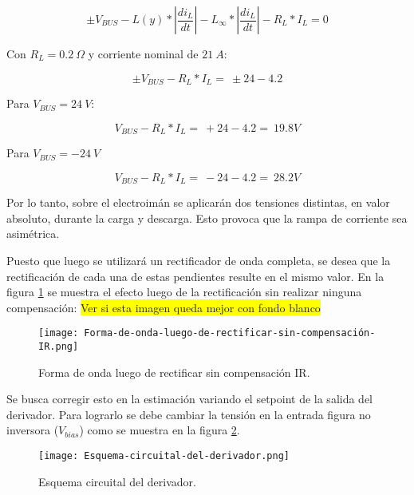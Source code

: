 \begin{equation} \label{eq_Vbus-didt-RL}
\pm V_{BUS}-L(y)*\left|\frac{{di}_L}{dt}\right|-L_{\infty }*\left|\frac{{di}_L}{dt}\right|-R_L*I_L=0
\end{equation}

\noindent Con  $R_L=0.2\ \mathit{\Omega}$ y corriente nominal  de $21\ A$:

\begin{equation} \label{eq_Vbus-didt-RL-2}
\pm V_{BUS}-R_L*I_L=\ \pm 24-4.2
\end{equation}

\noindent Para $V_{BUS}=24\ V$:

\begin{equation} \label{eq_Vbus-didt-RL-3}
	V_{BUS}-R_L*I_L=\ +24-4.2=\ 19.8V
\end{equation}

\noindent Para $V_{BUS}=-24\ V$

\begin{equation} \label{eq_Vbus-didt-RL-4}
	V_{BUS}-R_L*I_L=\ -24-4.2=\ 28.2V
\end{equation}

\noindent Por lo tanto, sobre el electroim\'{a}n se aplicar\'{a}n dos tensiones distintas, en valor absoluto, durante la carga y descarga. Esto provoca que la rampa de corriente sea asim\'{e}trica.

\noindent Puesto que luego se utilizar\'{a} un rectificador de onda completa, se desea que la rectificaci\'{o}n de cada una de estas pendientes resulte en el mismo valor. En la figura \ref{fig:img_Forma-de-onda-luego-de-rectificar-sin-compensación-IR} se muestra el efecto luego de la rectificaci\'{o}n sin realizar ninguna compensaci\'{o}n:
\colorbox{yellow}{Ver si esta imagen queda mejor con fondo blanco}
\begin{figure}[H]
	\centering
	\texttt{[image: Forma-de-onda-luego-de-rectificar-sin-compensación-IR.png]}
	\caption{Forma de onda luego de rectificar sin compensación IR.}
	\label{fig:img_Forma-de-onda-luego-de-rectificar-sin-compensación-IR}
\end{figure}

\noindent Se busca corregir esto en la estimaci\'{o}n variando el setpoint de la salida del derivador. Para lograrlo se debe cambiar la tensi\'{o}n en la entrada figura no inversora ($V_{bias}$) como se muestra en la figura \ref{fig:img_Esquema-circuital-del-derivador}. 

\begin{figure}[H]
	\centering
	\texttt{[image: Esquema-circuital-del-derivador.png]}
	\caption{Esquema circuital del derivador.}
	\label{fig:img_Esquema-circuital-del-derivador}
\end{figure}

